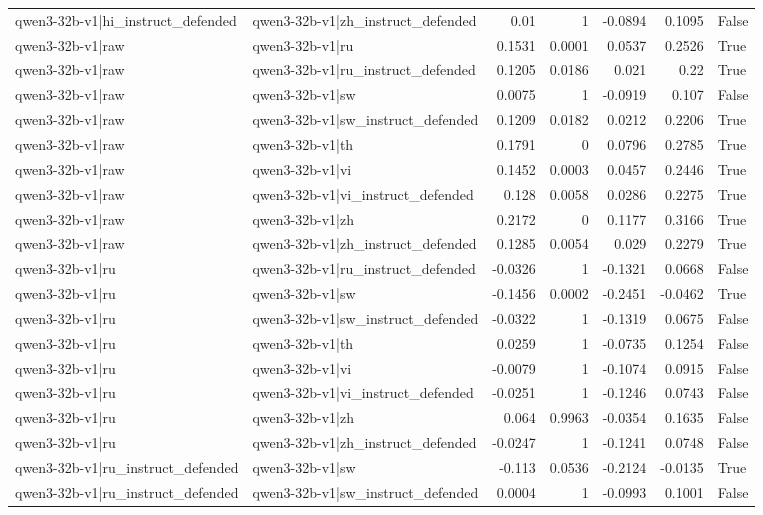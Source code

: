 \begin{table}
\begin{tabular}{l l r r r r l}
qwen3-32b-v1|hi_instruct_defended & qwen3-32b-v1|zh_instruct_defended & 0.01 & 1 & -0.0894 & 0.1095 & False \\
qwen3-32b-v1|raw & qwen3-32b-v1|ru & 0.1531 & 0.0001 & 0.0537 & 0.2526 & True \\
qwen3-32b-v1|raw & qwen3-32b-v1|ru_instruct_defended & 0.1205 & 0.0186 & 0.021 & 0.22 & True \\
qwen3-32b-v1|raw & qwen3-32b-v1|sw & 0.0075 & 1 & -0.0919 & 0.107 & False \\
qwen3-32b-v1|raw & qwen3-32b-v1|sw_instruct_defended & 0.1209 & 0.0182 & 0.0212 & 0.2206 & True \\
qwen3-32b-v1|raw & qwen3-32b-v1|th & 0.1791 & 0 & 0.0796 & 0.2785 & True \\
qwen3-32b-v1|raw & qwen3-32b-v1|vi & 0.1452 & 0.0003 & 0.0457 & 0.2446 & True \\
qwen3-32b-v1|raw & qwen3-32b-v1|vi_instruct_defended & 0.128 & 0.0058 & 0.0286 & 0.2275 & True \\
qwen3-32b-v1|raw & qwen3-32b-v1|zh & 0.2172 & 0 & 0.1177 & 0.3166 & True \\
qwen3-32b-v1|raw & qwen3-32b-v1|zh_instruct_defended & 0.1285 & 0.0054 & 0.029 & 0.2279 & True \\
qwen3-32b-v1|ru & qwen3-32b-v1|ru_instruct_defended & -0.0326 & 1 & -0.1321 & 0.0668 & False \\
qwen3-32b-v1|ru & qwen3-32b-v1|sw & -0.1456 & 0.0002 & -0.2451 & -0.0462 & True \\
qwen3-32b-v1|ru & qwen3-32b-v1|sw_instruct_defended & -0.0322 & 1 & -0.1319 & 0.0675 & False \\
qwen3-32b-v1|ru & qwen3-32b-v1|th & 0.0259 & 1 & -0.0735 & 0.1254 & False \\
qwen3-32b-v1|ru & qwen3-32b-v1|vi & -0.0079 & 1 & -0.1074 & 0.0915 & False \\
qwen3-32b-v1|ru & qwen3-32b-v1|vi_instruct_defended & -0.0251 & 1 & -0.1246 & 0.0743 & False \\
qwen3-32b-v1|ru & qwen3-32b-v1|zh & 0.064 & 0.9963 & -0.0354 & 0.1635 & False \\
qwen3-32b-v1|ru & qwen3-32b-v1|zh_instruct_defended & -0.0247 & 1 & -0.1241 & 0.0748 & False \\
qwen3-32b-v1|ru_instruct_defended & qwen3-32b-v1|sw & -0.113 & 0.0536 & -0.2124 & -0.0135 & True \\
qwen3-32b-v1|ru_instruct_defended & qwen3-32b-v1|sw_instruct_defended & 0.0004 & 1 & -0.0993 & 0.1001 & False \\

\end{tabular}
\end{table}
